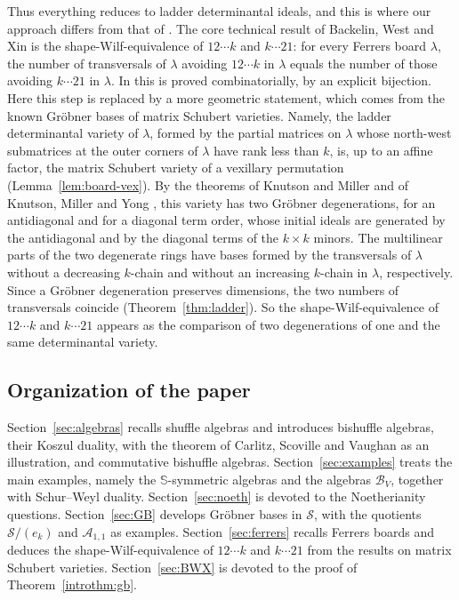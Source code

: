 \documentclass[11pt]{amsart}
\theoremstyle{definition}
\theoremstyle{remark}
\newcommand{\bS}{\mathbb{S}}
\newcommand{\cA}{\mathscr{A}}
\newcommand{\cB}{\mathcal{B}}
\newcommand{\cS}{\mathscr{S}}
\begin{document}
Thus everything reduces to ladder determinantal ideals, and this is where our approach differs from that of \cite{BWX}. The core technical result of Backelin, West and Xin is the shape-Wilf-equivalence of $12\cdots k$ and $k\cdots21$: for every Ferrers board $\lambda$, the number of transversals of $\lambda$ avoiding $12\cdots k$ in $\lambda$ equals the number of those avoiding $k\cdots21$ in $\lambda$. In \cite{BWX} this is proved combinatorially, by an explicit bijection. Here this step is replaced by a more geometric statement, which comes from the known Gr\"obner bases of matrix Schubert varieties. Namely, the ladder determinantal variety of $\lambda$, formed by the partial matrices on $\lambda$ whose north-west submatrices at the outer corners of $\lambda$ have rank less than $k$, is, up to an affine factor, the matrix Schubert variety of a vexillary permutation (Lemma~\ref{lem:board-vex}). By the theorems of Knutson and Miller \cite{KM} and of Knutson, Miller and Yong \cite{KMY}, this variety has two Gr\"obner degenerations, for an antidiagonal and for a diagonal term order, whose initial ideals are generated by the antidiagonal and by the diagonal terms of the $k\times k$ minors. The multilinear parts of the two degenerate rings have bases formed by the transversals of $\lambda$ without a decreasing $k$-chain and without an increasing $k$-chain in $\lambda$, respectively. Since a Gr\"obner degeneration preserves dimensions, the two numbers of transversals coincide (Theorem~\ref{thm:ladder}). So the shape-Wilf-equivalence of $12\cdots k$ and $k\cdots21$ appears as the comparison of two degenerations of one and the same determinantal variety.

\subsection{Organization of the paper}
Section~\ref{sec:algebras} recalls shuffle algebras and introduces bishuffle algebras, their Koszul duality, with the theorem of Carlitz, Scoville and Vaughan \cite{CSV} as an illustration, and commutative bishuffle algebras. Section~\ref{sec:examples} treats the main examples, namely the $\bS$-symmetric algebras and the algebras $\cB_V$, together with Schur--Weyl duality. Section~\ref{sec:noeth} is devoted to the Noetherianity questions. Section~\ref{sec:GB} develops Gr\"obner bases in $\cS$, with the quotients $\cS/(e_k)$ and $\cA_{1,1}$ as examples. Section~\ref{sec:ferrers} recalls Ferrers boards and deduces the shape-Wilf-equivalence of $12\cdots k$ and $k\cdots21$ from the results on matrix Schubert varieties. Section~\ref{sec:BWX} is devoted to the proof of Theorem~\ref{introthm:gb}.
\end{document}
